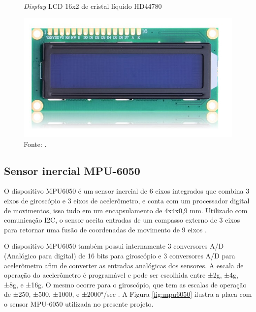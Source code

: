     	\begin{figure}[H]
    	    \centering
     	    \caption{\textit{Display} LCD 16x2 de cristal líquido HD44780}
      	    \label{fig:hd44780}
    	    \includegraphics[scale=0.5]{imagens/hd44780.jpg}
    	    \caption*{Fonte: .}

    	\end{figure}
	
	\subsection{Sensor inercial MPU-6050}
    	O dispositivo MPU6050 é um sensor inercial de 6 eixos integrados que combina 3 eixos de giroscópio e 3 eixos de acelerômetro, e conta com um processador digital de movimentos, isso tudo em  um encapsulamento de 4x4x0,9 mm. Utilizado com comunicação I2C, o sensor aceita entradas de um compasso externo de 3 eixos para retornar uma fusão de coordenadas de movimento de 9 eixos \cite{mpu6050}.
        
        O dispositivo MPU6050 também possui internamente 3 conversores A/D (Analógico para digital) de 16 bits para giroscópio e 3 conversores A/D para acelerômetro afim de converter as entradas analógicas dos sensores. A escala de operação do acelerômetro é programável e pode ser escolhida entre  ±2g, ±4g, ±8g, e ±16g. O mesmo ocorre para o giroscópio, que tem as escalas de operação de ±250, ±500, ±1000, e ±2000°/sec \cite{mpu6050}. A Figura \ref{fig:mpu6050} ilustra a placa com o sensor MPU-6050 utilizada no presente projeto.

